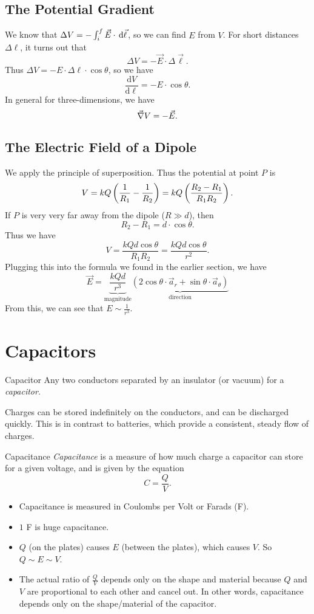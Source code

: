 \documentclass[class=article, crop=false]{standalone}
\begin{document}
  \subsection{The Potential Gradient}
  We know that $\Delta V = -\int_{i}^{f}\vec{E}\cdot  \,\mathrm{d}\vec{\ell}$, so we can find $E$ from $V$. For short distances $\Delta\ell$, it turns out that
  \[
    \Delta V = -\vec{E}\cdot \Delta\vec{\ell}.
  \]
  Thus $\Delta V = -E\cdot \Delta \ell\cdot \cos\theta$, so we have
  \[
    \boxed{\frac{\mathrm{d}V}{\mathrm{d}\ell} = -E\cdot \cos\theta.}
  \]
  In general for three-dimensions, we have
  \[
    \vec{\nabla}V = -\vec{E}.
  \]
  \subsection{The Electric Field of a Dipole}
  We apply the principle of superposition. Thus the potential at point $P$ is 
  \[
    V = kQ \left( \frac{1}{R_1}-\frac{1}{R_2} \right) = kQ \left( \frac{R_2-R_1}{R_1R_2} \right).
  \]
  If $P$ is very very far away from the dipole ($R \gg d$), then
  \[
    R_2 - R_1 = d\cdot \cos\theta.
  \]
  Thus we have
  \[
    V = \frac{kQd\cos\theta}{R_1R_2} = \frac{kQd\cos\theta}{r^2}.
  \]
  Plugging this into the formula we found in the earlier section, we have
  \[
    \vec{E} = \underbrace{\frac{kQd}{r^3}}_{\text{magnitude}}\underbrace{(2\cos\theta\cdot \vec{a}_r+\sin\theta\cdot \vec{a}_\theta)}_{\text{direction}}
  \]
  From this, we can see that $E\sim \frac{1}{r^3}$.
  \newpage
  \section{Capacitors}
  \begin{definition}{Capacitor}
    Any two conductors separated by an insulator (or vacuum) for a \emph{capacitor}.
  \end{definition}
  Charges can be stored indefinitely on the conductors, and can be discharged quickly. This is in contrast to batteries, which provide a consistent, steady flow of charges.
  \begin{definition}{Capacitance}
    \emph{Capacitance} is a measure of how much charge a capacitor can store for a given voltage, and is given by the equation
    \[
      C = \frac{Q}{V}.
    \]
    \begin{itemize}
      \item Capacitance is measured in Coulombs per Volt or Farads (F).
      \item $1$ F is huge capacitance.
      \item $Q$ (on the plates) causes $E$ (between the plates), which causes $V$. So $Q\sim E\sim V$.
      \item The actual ratio of $\frac{Q}{V}$ depends only on the shape and material because $Q$ and $V$ are proportional to each other and cancel out. In other words, capacitance depends only on the shape/material of the capacitor.
    \end{itemize}
  \end{definition}
\end{document}

